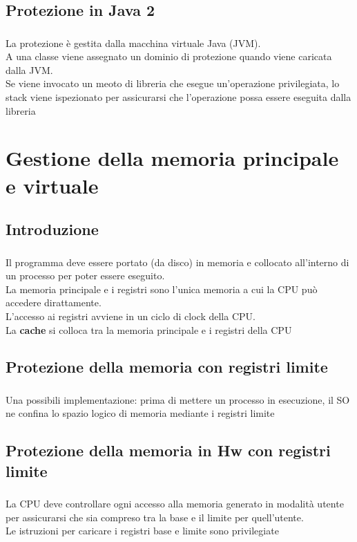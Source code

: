 \documentclass{beamer}
\newenvironment{mainframe}{
	\begin{frame}
		\frametitle{\insertsubsection}
		\framesubtitle{\insertsection}
	}{
	\end{frame}
}
\begin{document}
\subsection{Protezione in Java 2}
\begin{mainframe}
	La protezione è gestita dalla macchina virtuale Java (JVM).\\
	A una classe viene assegnato un dominio di protezione quando viene caricata dalla JVM.\\
	Se viene invocato un meoto di libreria che esegue un'operazione privilegiata, lo stack viene ispezionato per assicurarsi che l'operazione possa essere eseguita dalla libreria
\end{mainframe}
\section{Gestione della memoria principale e virtuale}
\subsection{Introduzione}
\begin{mainframe}
	Il programma deve essere portato (da disco) in memoria e collocato all'interno di un processo per poter essere eseguito.\\
	La memoria principale e i registri sono l'unica memoria a cui la CPU può accedere dirattamente.\\
	L'accesso ai registri avviene in un ciclo di clock della CPU.\\
	La \textbf{cache} si colloca tra la memoria principale e i registri della CPU
\end{mainframe}
\subsection{Protezione della memoria con registri limite}
\begin{mainframe}
	Una possibili implementazione: prima di mettere un processo in esecuzione, il SO ne confina lo spazio logico di memoria mediante i registri limite
\end{mainframe}
\subsection{Protezione della memoria in Hw con registri limite}
\begin{mainframe}
	La CPU deve controllare ogni accesso alla memoria generato in modalità utente per assicurarsi che sia compreso tra la base e il limite per quell'utente.\\
	Le istruzioni per caricare i registri base e limite sono privilegiate
\end{mainframe}
\end{document}
